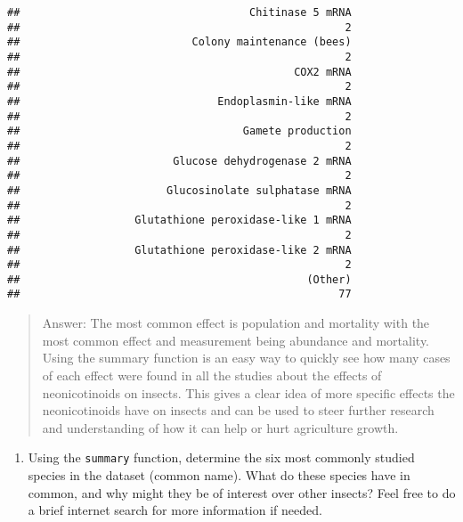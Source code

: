 \documentclass[]{article}
\newenvironment{Shaded}{\begin{snugshade}}{\end{snugshade}}
\newcommand{\KeywordTok}[1]{\textcolor[rgb]{0.13,0.29,0.53}{\textbf{#1}}}
\newcommand{\NormalTok}[1]{#1}
\newcommand{\OperatorTok}[1]{\textcolor[rgb]{0.81,0.36,0.00}{\textbf{#1}}}
\providecommand{\tightlist}{%
  \setlength{\itemsep}{0pt}\setlength{\parskip}{0pt}}
\begin{document}
\begin{verbatim}
##                                    Chitinase 5 mRNA 
##                                                   2 
##                           Colony maintenance (bees) 
##                                                   2 
##                                           COX2 mRNA 
##                                                   2 
##                               Endoplasmin-like mRNA 
##                                                   2 
##                                   Gamete production 
##                                                   2 
##                        Glucose dehydrogenase 2 mRNA 
##                                                   2 
##                       Glucosinolate sulphatase mRNA 
##                                                   2 
##                  Glutathione peroxidase-like 1 mRNA 
##                                                   2 
##                  Glutathione peroxidase-like 2 mRNA 
##                                                   2 
##                                             (Other) 
##                                                  77
\end{verbatim}

\begin{quote}
Answer: The most common effect is population and mortality with the most
common effect and measurement being abundance and mortality. Using the
summary function is an easy way to quickly see how many cases of each
effect were found in all the studies about the effects of neonicotinoids
on insects. This gives a clear idea of more specific effects the
neonicotinoids have on insects and can be used to steer further research
and understanding of how it can help or hurt agriculture growth.
\end{quote}

\begin{enumerate}
\def\labelenumi{\arabic{enumi}.}
\setcounter{enumi}{6}
\tightlist
\item
  Using the \texttt{summary} function, determine the six most commonly
  studied species in the dataset (common name). What do these species
  have in common, and why might they be of interest over other insects?
  Feel free to do a brief internet search for more information if
  needed.
\end{enumerate}

\begin{Shaded}
\end{Shaded}
\end{document}
